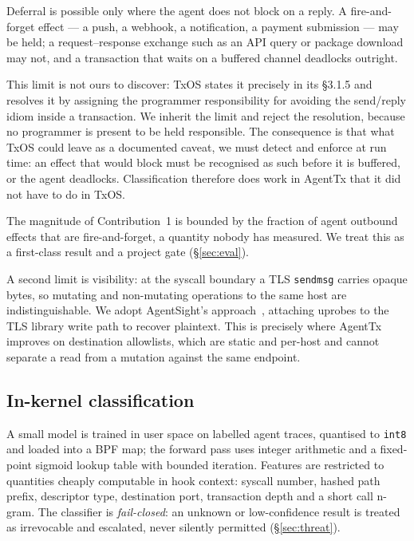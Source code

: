 \documentclass[10pt,twocolumn]{article}
\newcommand{\sys}{AgentTx}
\begin{document}
Deferral is possible only where the agent does not block on a reply. A
fire-and-forget effect --- a push, a webhook, a notification, a payment
submission --- may be held; a request--response exchange such as an API query or
package download may not, and a transaction that waits on a buffered channel
deadlocks outright.

This limit is not ours to discover: TxOS states it precisely in its \S3.1.5 and
resolves it by assigning the programmer responsibility for avoiding the
send/reply idiom inside a transaction. We inherit the limit and reject the
resolution, because no programmer is present to be held responsible. The
consequence is that what TxOS could leave as a documented caveat, we must detect
and enforce at run time: an effect that would block must be recognised as such
before it is buffered, or the agent deadlocks. Classification therefore does
work in \sys{} that it did not have to do in TxOS.

The magnitude of Contribution~1 is bounded by the fraction of agent outbound
effects that are fire-and-forget, a quantity nobody has measured. We treat this
as a first-class result and a project gate (\S\ref{sec:eval}).

A second limit is visibility: at the syscall boundary a TLS \texttt{sendmsg}
carries opaque bytes, so mutating and non-mutating operations to the same host
are indistinguishable. We adopt AgentSight's approach~\cite{agentsight2025},
attaching uprobes to the TLS library write path to recover plaintext. This is
precisely where \sys{} improves on destination allowlists, which are static and
per-host and cannot separate a read from a mutation against the same endpoint.

\subsection{In-kernel classification}

A small model is trained in user space on labelled agent traces, quantised to
\texttt{int8} and loaded into a BPF map; the forward pass uses integer
arithmetic and a fixed-point sigmoid lookup table with bounded iteration.
Features are restricted to quantities cheaply computable in hook context:
syscall number, hashed path prefix, descriptor type, destination port,
transaction depth and a short call n-gram. The classifier is \emph{fail-closed}:
an unknown or low-confidence result is treated as irrevocable and escalated,
never silently permitted (\S\ref{sec:threat}).
\end{document}
